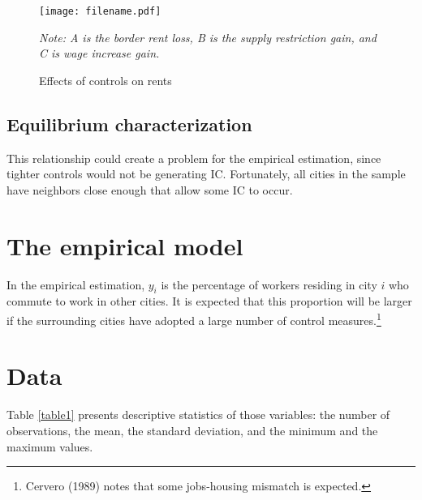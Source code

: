 \documentclass[12pt]{article}%
\begin{document}
\begin{figure}[h]
   \caption{Effects of controls on rents}
   \centering  
     \texttt{[image: filename.pdf]} \\

\footnotesize

\textit{Note: A is the border rent loss, B is the supply restriction gain, and C is wage increase gain.}
   \label{yourkey} 
\end{figure}

\normalsize



\subsection{Equilibrium characterization}

This relationship could create a problem for the empirical estimation, since tighter controls would not be generating IC. Fortunately, all cities in the sample have neighbors close enough that allow some IC to occur.






\section{The empirical model}
\label{empirical}


In the empirical estimation, $y_{i}$ is the percentage of workers residing in city $i$ who commute to work in other cities. It is expected that this proportion will be larger if the surrounding cities have adopted a large number of control measures.\footnote{Cervero (1989) notes that some jobs-housing mismatch is expected.}







\section{Data}
\label{data}

Table \ref{table1} presents descriptive statistics of those variables: the number of observations, the mean, the standard deviation, and the minimum and the maximum values. 
\end{document}
